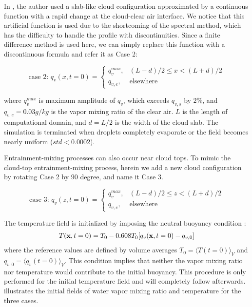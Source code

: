 In \cite{Kumar2012Cloud}, the author used a slab-like cloud configuration approximated by a continuous 
function with a rapid change at the cloud-clear air interface. We notice that this artificial function is 
used due to the shortcoming of the spectral method, which has the difficulty to handle the profile with discontinuities. Since a finite difference method is used here, we can simply replace this function with a discontinuous formula and refer it as Case 2:

\begin{equation}
\mbox{case 2: } q_v(x,t=0) = 
\left\{\begin{array}{lr}
q_v^{max}, & (L-d)/2 \le x < (L+d)/2\\
q_{v,e}, & \mbox{elsewhere}
\end{array}\right.\label{case2}
\end{equation}

where $q_v^{max}$ is maximum amplitude of $q_v$, which exceeds $q_{v,s}$ by
$2\%$, and $q_{v,e} = 0.03g/kg$ is the vapor mixing ratio of the clear air. $L$
is the length of computational domain, and $d = L/2$ is the width of the cloud
slab. The simulation is terminated when droplets completely evaporate or the
field becomes nearly uniform ($std<0.0002$).

Entrainment-mixing processes can also occur near cloud tops. To mimic the
cloud-top entrainment-mixing process, herein we add a new cloud configuration
by rotating Case 2 by $90$ degree, and name it Case 3.

\begin{equation}
\mbox{case 3: } q_v(z,t=0) = 
\left\{\begin{array}{lr}
q_v^{max}, & (L-d)/2 \le z < (L+d)/2\\
q_{v,e}, & \mbox{elsewhere}
\end{array}\right.\label{case3}
\end{equation}

The temperature field is initialized by imposing the neutral buoyancy condition \cite{Kumar2014Lagrangian}:
\begin{equation}
T(\mathbf{x},t = 0) = T_0 - 0.608T_0[q_v(\mathbf{x},t = 0) - q_{v,0}]
\end{equation}
where the reference values are defined by volume averages $T_0 = \langle
T(t=0)\rangle_V$ and $q_{v,0} = \langle q_v(t=0)\rangle_V$. This condition
implies that neither the vapor mixing ratio nor temperature would contribute to
the initial buoyancy. This procedure is only performed for the initial
temperature field and will completely follow  afterwards.
 illustrates the initial fields of water vapor mixing
ratio and temperature for the three cases.

